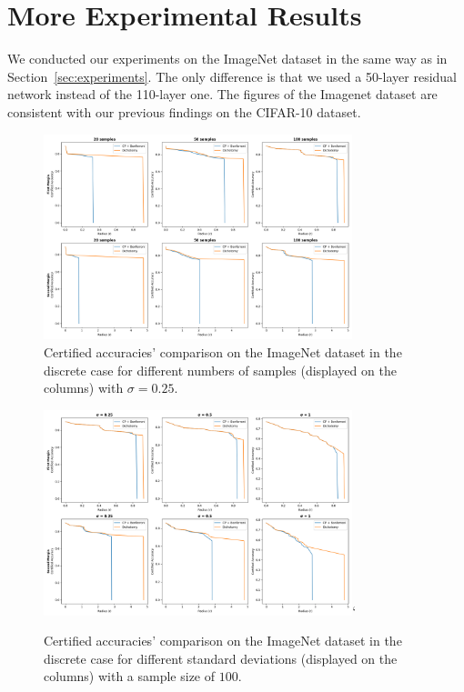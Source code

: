 \section{More Experimental Results}\label{sec:more-experimental-results}
We conducted our experiments on the ImageNet dataset in the same way as in Section~\ref{sec:experiments}.
The only difference is that we used a 50-layer residual network instead of the 110-layer one.
The figures of the Imagenet dataset are consistent with our previous findings on the CIFAR-10 dataset.
\begin{figure}[htbp]
    \centering
    \includegraphics[width=0.8\textwidth]{images/discrete_num_imagenet}
    \caption{Certified accuracies' comparison on the ImageNet dataset in the discrete case for different numbers of samples (displayed on the columns) with $\sigma = 0.25$.}
    \label{fig:discrete_num_imagenet}
\end{figure}
\begin{figure}[htbp]
    \centering
    \includegraphics[width=0.8\textwidth]{images/discrete_sigma_imagenet}`
    \caption{Certified accuracies' comparison on the ImageNet dataset in the discrete case for different standard deviations (displayed on the columns) with a sample size of $100$.}
    \label{fig:discrete_sigma_imagenet}
\end{figure}
